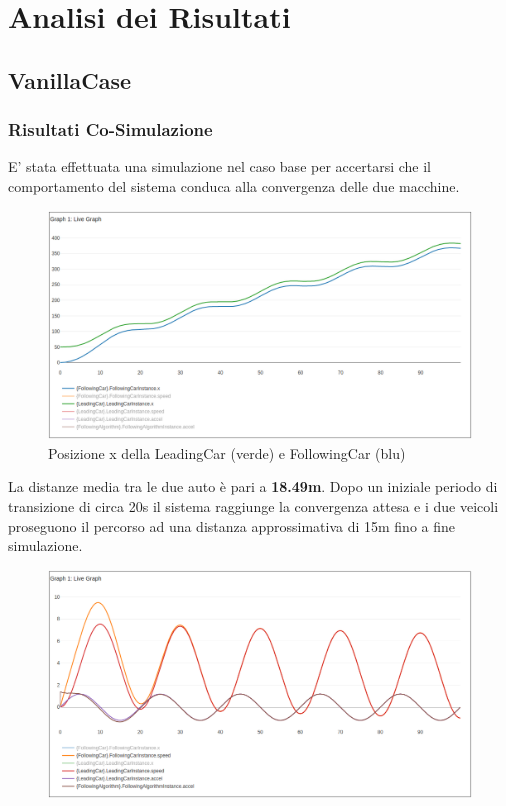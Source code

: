 \section{Analisi dei Risultati}
\subsection{VanillaCase}
\subsubsection{Risultati Co-Simulazione}
E' stata effettuata una simulazione nel caso base per accertarsi che il comportamento del sistema conduca alla convergenza delle due macchine.

\begin{figure}[h]
	\centering
	\includegraphics[width=\textwidth]{img/x.png}
	\caption{Posizione x della LeadingCar (verde) e FollowingCar (blu)}
\end{figure}

La distanze media tra le due auto è pari a \textbf{18.49m}. Dopo un iniziale periodo di transizione di circa 20s il sistema raggiunge la convergenza attesa e i due veicoli proseguono il percorso ad una distanza approssimativa di 15m fino a fine simulazione.

\begin{figure}[H]
	\centering
	\includegraphics[width=\textwidth]{img/accel_speed.png}
	\caption{}
\end{figure}

